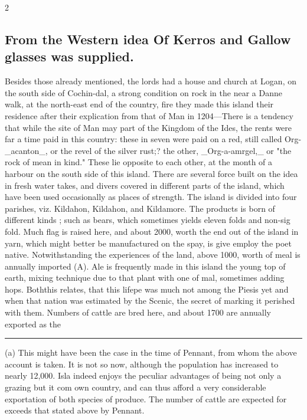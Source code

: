 \documentclass[10pt]{article}
\begin{document}
\begin{multicols}{2}
\subsection*{From the Western idea Of Kerros and Gallow glasses was supplied.}
Besides those already mentioned, the lords had a house and church at Logan, on the south side of Cochin-dal, a strong condition on rock in the near a Danne walk, at the north-east end of the country, fire they made this island their residence after their explication from that of Man in 1204—There is a tendency that while the site of Man may part of the Kingdom of the Ides, the rents were far a time paid in this country: these in seven were paid on a red, still called Org- \_acanton\_, or the revel of the silver rust;? the other, \_Org-a-amrgel,\_ or "the rock of mean in kind." These lie opposite to each other, at the month of a harbour on the south side of this island. There are several force built on the idea in fresh water takes, and divers covered in different parts of the island, which have been used occasionally as places of strength. The island is divided into four parishes, viz. Kildahon, Kildahon, and Kildamore. The products is born of different kinds ; such as bears, which sometimes yields eleven folds and non-sig fold. Much flag is raised here, and about 2000, worth the end out of the island in yarn, which might better be manufactured on the spay, is give employ the poet native. Notwithstanding the experiences of the land, above 1000, worth of meal is annually imported (A). Ale is frequently made in this island the young top of earth, mixing technique due to that plant with one of mal, sometimes adding hops. Boththis relates, that this lifepe was much not among the Piesis yet and when that nation was estimated by the Scenic, the secret of marking it perished with them. Numbers of cattle are bred here, and about 1700 are annually exported as the

\end{multicols}
\par\vspace{4pt}\noindent\rule{0.3\linewidth}{0.4pt}\par
{\footnotesize
(a) This might have been the case in the time of Pennant, from whom the above account is taken. It is not so now, although the population has increased to nearly 12,000. Isla indeed enjoys the peculiar advantages of being not only a grazing but it com own country, and can thus afford a very considerable exportation of both species of produce. The number of cattle are expected for exceeds that stated above by Pennant.\par}
\end{document}
